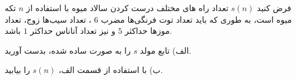 \EXERCISE
فرض کنید 
$s(n)$
 تعداد راه های مختلف درست کردن سالاد میوه با استفاده از 
$n$
  تکه میوه است، به طوری که باید تعداد توت فرنگی‌ها مضرب 
$6$
  ، تعداد سیب‌ها زوج، تعداد موزها حداکثر 
$5$
   و نیز تعداد آناناس حداکثر 
$1$
    باشد.
    
    الف) تابع مولد 
$s$
     را به صورت ساده شده، بدست آورید. 
     
     ب) با استفاده از قسمت الف،
$s(n)$
      را بیابید.